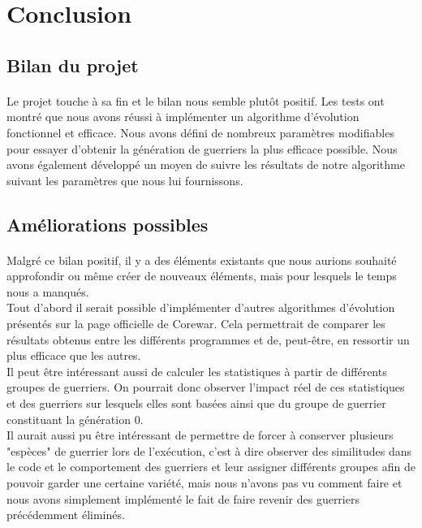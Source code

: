\documentclass[french]{article}
\begin{document}
\newpage
\section{Conclusion}
    \subsection{Bilan du projet}
        \paragraph{}Le projet touche à sa fin et le bilan nous semble plutôt positif. Les tests ont montré que nous avons réussi à implémenter un algorithme d'évolution fonctionnel et efficace. Nous avons défini de nombreux paramètres modifiables pour essayer d'obtenir la génération de guerriers la plus efficace possible. Nous avons également développé un moyen de suivre les résultats de notre algorithme suivant les paramètres que nous lui fournissons. 
    
    \subsection{Améliorations possibles}
    
    \paragraph{}Malgré ce bilan positif, il y a des éléments existants que nous aurions souhaité approfondir ou même créer de nouveaux éléments, mais pour lesquels le temps nous a manqués. \\
    Tout d'abord il serait possible d'implémenter d'autres algorithmes d'évolution présentés sur la page officielle de Corewar. Cela permettrait de comparer les résultats obtenus entre les différents programmes et de, peut-être, en ressortir un plus efficace que les autres. \\
    Il peut être intéressant aussi de calculer les statistiques à partir de différents groupes de guerriers. On pourrait donc observer l'impact réel de ces statistiques et des guerriers sur lesquels elles sont basées ainsi que du groupe de guerrier constituant la génération 0.\\
    Il aurait aussi pu être intéressant de permettre de forcer à conserver plusieurs "espèces" de guerrier lors de l'exécution, c'est à dire observer des similitudes dans le code et le comportement des guerriers et leur assigner différents groupes afin de pouvoir garder une certaine variété, mais nous n'avons pas vu comment faire et nous avons simplement implémenté le fait de faire revenir des guerriers précédemment éliminés.
\end{document}
